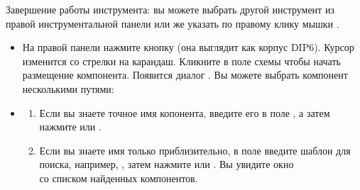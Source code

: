 Завершение работы инструмента: вы можете выбрать другой инструмент из правой
инструментальной панели или же указать  по правому
клику мышки \keys{\rms}.

\secdown


\begin{itemize}
  \item 
На правой панели нажмите кнопку  (она выглядит как
корпус DIP6). Курсор изменится со стрелки на карандаш.
Кликните в поле схемы чтобы начать размещение компонента. Появится диалог
. Вы можете выбрать компонент несколькими путями:
  \item
  \begin{enumerate}
    \item 
Если вы знаете точное имя копонента, введите его в поле , а
затем нажмите  или .
    \item 
Если вы знаете имя только приблизительно, в поле  введите шаблон для
поиска, например, , затем нажмите  или . Вы
увидите окно \\ со списком найденных компонентов.


\end{enumerate}
\end{itemize}
